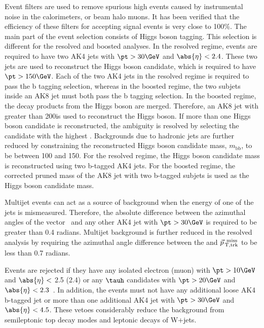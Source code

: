 Event filters are used to remove spurious high \MET events caused by instrumental noise in the calorimeters, or beam halo muons. It has 
been verified that the efficiency of these filters for accepting signal events is very close to 100\%.
The main part of the event selection consists of Higgs boson tagging. This selection is different for the resolved and boosted analyses.
In the resolved regime, events are
required to have two AK4 jets with $\pt>30\GeV$ and $\abs{\eta}< 2.4$.
These two jets are used to reconstruct the Higgs boson candidate, which
is required to have $\pt > 150\GeV$.
Each of the two AK4 jets in the resolved regime is required to pass the b tagging selection, whereas in the boosted regime, the two subjets 
inside an AK8 jet must both pass the b tagging selection.
In the boosted regime, the decay products from the Higgs boson are merged. Therefore, an AK8 jet with \pt greater than 200\GeV is used to 
reconstruct
the Higgs boson. If more than one Higgs boson candidate is reconstructed, the ambiguity is resolved by selecting the candidate with the 
highest \pt.
Backgrounds due to hadronic jets are further reduced by constraining the reconstructed Higgs boson candidate mass, $m_\mathrm{bb}$, to be 
between 100 and 150\GeV.
For the resolved regime, the Higgs boson candidate mass is reconstructed using two b-tagged AK4 jets.
For the boosted regime, the corrected pruned mass of the AK8 jet with two b-tagged subjets is used as the Higgs boson candidate mass.

Multijet events can act as a source of background  when the energy of one of the jets is mismeasured.
Therefore, the absolute difference between the azimuthal angles of the vector
\ptvecmiss\ and any other AK4 jet with $\pt > 30\GeV$
is required to be greater than 0.4 radians.
Multijet background is further reduced in the
resolved analysis by requiring the azimuthal angle difference between the \ptvecmiss and $\vec{p}_{\mathrm{\, T,trk}}^{\text{\, miss}}$ to 
be less than 0.7 radians.


Events are rejected if they have any
isolated electron (muon) with $\pt > 10\GeV$ and $\abs{\eta} < $ 2.5 (2.4) or any $\tauh$ candidates with $\pt > 20\GeV$ and 
$\abs{\eta} < 2.3$~\cite{Khachatryan:2015hwa,Chatrchyan:2013sba,CMSTauJINST}.
In addition, the events must not have any additional loose AK4 b-tagged jet or
more than one additional AK4 jet with $\pt > 30\GeV$ and $\abs{\eta} < 4.5$.
These vetoes considerably reduce the background from semileptonic top decay
modes and leptonic decays of W+jets.

